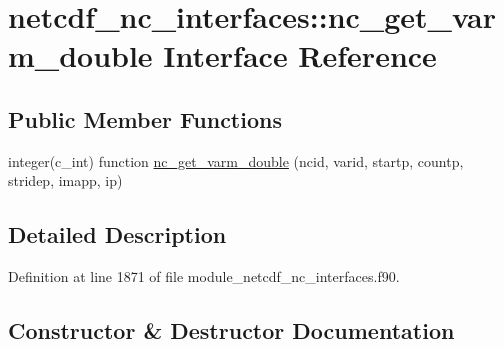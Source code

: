 \hypertarget{interfacenetcdf__nc__interfaces_1_1nc__get__varm__double}{}\section{netcdf\+\_\+nc\+\_\+interfaces\+:\+:nc\+\_\+get\+\_\+varm\+\_\+double Interface Reference}
\label{interfacenetcdf__nc__interfaces_1_1nc__get__varm__double}
\subsection*{Public Member Functions}
\begin{DoxyCompactItemize}
\item 
integer(c\+\_\+int) function \hyperlink{interfacenetcdf__nc__interfaces_1_1nc__get__varm__double_af8372747f2ef1e46c60b6745891a76cc}{nc\+\_\+get\+\_\+varm\+\_\+double} (ncid, varid, startp, countp, stridep, imapp, ip)
\end{DoxyCompactItemize}


\subsection{Detailed Description}


Definition at line 1871 of file module\+\_\+netcdf\+\_\+nc\+\_\+interfaces.\+f90.



\subsection{Constructor \& Destructor Documentation}
\mbox{\label{interfacenetcdf__nc__interfaces_1_1nc__get__varm__double_af8372747f2ef1e46c60b6745891a76cc}} 
